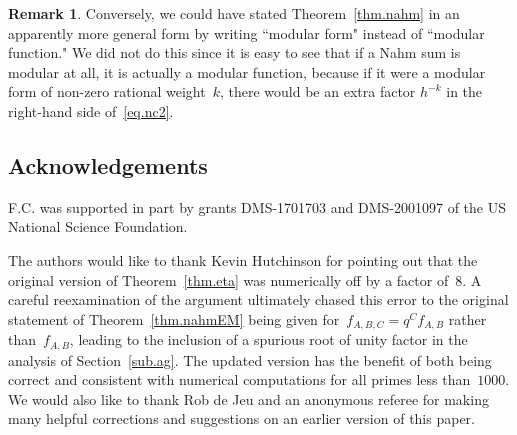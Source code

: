 \documentclass[12pt,reqno]{amsart}
\theoremstyle{definition}
\newtheorem{remark}[theorem]{Remark}
\newcommand{\changed}[1]{{#1}}
\begin{document}
\begin{remark}
Conversely, we could have stated Theorem~\ref{thm.nahm} in an apparently
more general form by writing ``modular form" instead of ``modular function." 
We did not do this since it is easy to see that if a Nahm sum is modular at 
all, it is actually a modular function, because if it were a modular form of 
non-zero rational weight~$k$, there would be an extra factor $h^{-k}$ in the 
right-hand side of~\eqref{eq.nc2}.
\end{remark}

\subsection*{Acknowledgements} 
F.C. was supported in part by grants  DMS-1701703 and DMS-2001097
of the US National Science Foundation. 

\changed{The authors would like to thank Kevin Hutchinson for pointing out
  that the original version of Theorem~\ref{thm.eta} was numerically off
  by a factor of~$8$. A careful reexamination of the argument ultimately
  chased this error to  the original statement of Theorem~\ref{thm.nahmEM}
  being given for~$f_{A,B,C} = q^C f_{A,B}$ rather than~$f_{A,B}$, leading to
  the inclusion of a spurious root of unity factor in the analysis
  of Section~\ref{sub.ag}. The updated version has the benefit of both being
  correct and consistent with numerical computations for all primes less
  than~$1000$. We would also like to thank Rob de Jeu and an anonymous
  referee for making many helpful corrections and suggestions on an earlier
  version of this paper. }



%
%

\end{document}
